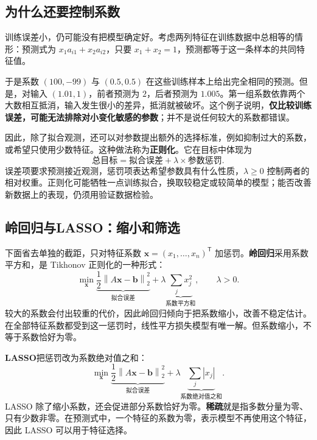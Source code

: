\documentclass[UTF8,fontset=fandol,a4paper,12pt]{ctexart}
\newcommand{\vx}{\boldsymbol x}
\newcommand{\vb}{\boldsymbol b}
\newcommand{\norm}[1]{\left\lVert#1\right\rVert}
\theoremstyle{definition}
\begin{document}
\subsection{为什么还要控制系数}\label{sub:regularization}
训练误差小，仍可能没有把模型确定好。考虑两列特征在训练数据中总相等的情形：预测式为 $x_1a_{i1}+x_2a_{i2}$，只要 $x_1+x_2=1$，预测都等于这一条样本的共同特征值。

于是系数 $(100,-99)$ 与 $(0.5,0.5)$ 在这些训练样本上给出完全相同的预测。但是，对输入 $(1.01,1)$，前者预测为 $2$，后者预测为 $1.005$。第一组系数依靠两个大数相互抵消，输入发生很小的差异，抵消就被破坏。这个例子说明，\textbf{仅比较训练误差，可能无法排除对小变化敏感的参数}；并不是说任何较大的系数都错误。

因此，除了拟合观测，还可以对参数提出额外的选择标准，例如抑制过大的系数，或希望只使用少数特征。这种做法称为\textbf{正则化}。它在目标中体现为
\[
 \boxed{\text{总目标}=\text{拟合误差}+\lambda\times\text{参数惩罚}.}
\]
误差项要求预测接近观测，惩罚项表达希望参数具有什么性质，$\lambda\ge0$ 控制两者的相对权重。正则化可能牺牲一点训练拟合，换取较稳定或较简单的模型；能否改善新数据上的表现，仍须用验证数据检验。

\subsection{岭回归与LASSO：缩小和筛选}
下面省去单独的截距，只对特征系数 $\vx=(x_1,\ldots,x_n)^{\mathsf T}$ 加惩罚。\textbf{岭回归}采用系数平方和，是 Tikhonov 正则化的一种形式：
\begin{equation}\label{eq:ridge}
 \boxed{\min_{\vx}\underbrace{\frac12\norm{A\vx-\vb}_2^2}_{\text{拟合误差}}
 +\lambda\underbrace{\sum_jx_j^2}_{\text{系数平方和}},\qquad\lambda>0.}
\end{equation}
较大的系数会付出较重的代价，因此岭回归倾向于把系数缩小，改善不稳定估计。在全部特征系数都受到这一惩罚时，线性平方损失模型有唯一解。但系数缩小，不等于系数恰好为零。

\textbf{LASSO}把惩罚改为系数绝对值之和：
\begin{equation}\label{eq:lasso}
 \boxed{\min_{\vx}\underbrace{\frac12\norm{A\vx-\vb}_2^2}_{\text{拟合误差}}
 +\lambda\underbrace{\sum_j|x_j|}_{\text{系数绝对值之和}}.}
\end{equation}
LASSO 除了缩小系数，还会促进部分系数恰好为零。\textbf{稀疏}就是指多数分量为零、只有少数非零。在预测式中，一个特征的系数为零，表示模型不再使用这个特征，因此 LASSO 可以用于特征选择。
\end{document}
